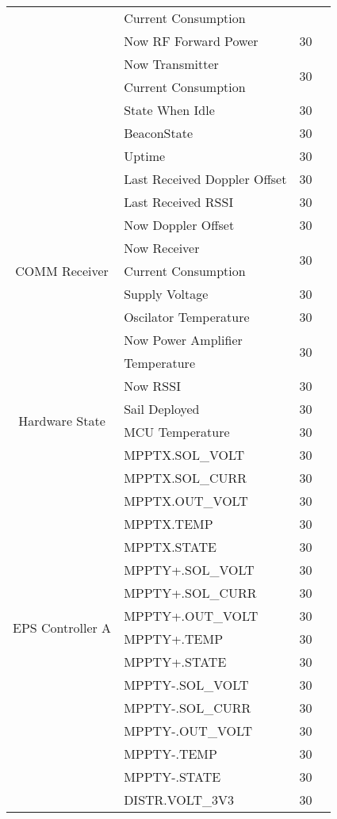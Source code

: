 \begin{longtable}{c|l|c|l}
    & Current Consumption & \\
    & Now RF Forward Power & 30 \\
    & Now Transmitter & \multirow{2}{*}{30} \\
    & Current Consumption & \\
    & State When Idle & 30 \\
    & BeaconState & 30 \\
    \hline
    \multirow{11}{*}{COMM Receiver} & Uptime & 30 \\
    & Last Received Doppler Offset & 30 \\
    & Last Received RSSI & 30 \\
    & Now Doppler Offset & 30 \\
    & Now Receiver & \multirow{2}{*}{30} \\
    & Current Consumption & \\
    & Supply Voltage & 30 \\
    & Oscilator Temperature & 30 \\
    & Now Power Amplifier  & \multirow{2}{*}{30} \\
    & Temperature & \\
    & Now RSSI & 30 \\
    \hline
    \multirow{2}{*}{Hardware State} & Sail Deployed & 30 \\
    & MCU Temperature & 30 \\
    \hline
    \multirow{38}{*}{EPS Controller A} & MPPTX.SOL_VOLT & 30 \\
    & MPPTX.SOL_CURR & 30 \\
    & MPPTX.OUT_VOLT & 30 \\
    & MPPTX.TEMP & 30 \\
    & MPPTX.STATE & 30 \\
    \cline{2-4}
    & MPPTY+.SOL_VOLT & 30 \\
    & MPPTY+.SOL_CURR & 30 \\
    & MPPTY+.OUT_VOLT & 30 \\
    & MPPTY+.TEMP & 30 \\
    & MPPTY+.STATE & 30 \\
    \cline{2-4}
    & MPPTY-.SOL_VOLT & 30 \\
    & MPPTY-.SOL_CURR & 30 \\
    & MPPTY-.OUT_VOLT & 30 \\
    & MPPTY-.TEMP & 30 \\
    & MPPTY-.STATE & 30 \\
    \cline{2-4}
    & DISTR.VOLT_3V3 & 30 \\

\end{longtable}
